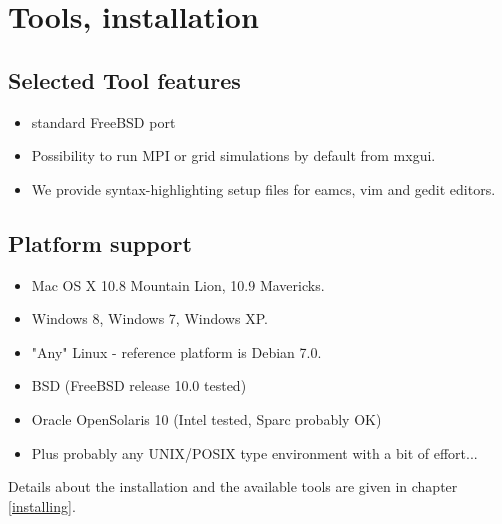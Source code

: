 
\section{Tools, installation}
\label{s:new-features:tools}
\subsection{Selected Tool features}
\begin{itemize}
  \item standard FreeBSD port
  \item Possibility to run MPI or grid simulations by default from mxgui.
  \item We provide syntax-highlighting setup files for eamcs, vim and gedit editors.
\end{itemize}
\subsection{Platform support}
\begin{itemize}
\item Mac OS X 10.8 Mountain Lion, 10.9 Mavericks.
\item Windows 8, Windows 7, Windows XP.
\item "Any" Linux - reference platform is Debian 7.0.
\item BSD (FreeBSD release 10.0 tested)
\item Oracle OpenSolaris 10 (Intel tested, Sparc probably OK)
\item Plus probably any UNIX/POSIX type environment with a bit of effort...
\end{itemize}
Details about the installation and the available tools are given in chapter \ref{installing}.

